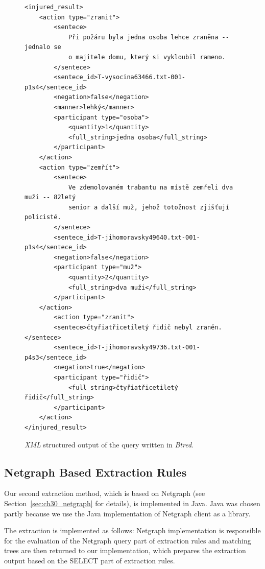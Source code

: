 \begin{figure}
\begin{verbatim}
<injured_result>
	<action type="zranit">
		<sentece>
			Při požáru byla jedna osoba lehce zraněna -- jednalo se
			o majitele domu, který si vykloubil rameno.
		</sentece>
		<sentece_id>T-vysocina63466.txt-001-p1s4</sentece_id>
		<negation>false</negation>
		<manner>lehký</manner>
		<participant type="osoba">
			<quantity>1</quantity>
			<full_string>jedna osoba</full_string>
		</participant>
	</action>
	<action type="zemřít">
		<sentece>
			Ve zdemolovaném trabantu na místě zemřeli dva muži -- 82letý
			senior a další muž, jehož totožnost zjišťují policisté.
		</sentece>
		<sentece_id>T-jihomoravsky49640.txt-001-p1s4</sentece_id>
		<negation>false</negation>
		<participant type="muž">
			<quantity>2</quantity>
			<full_string>dva muži</full_string>
		</participant>
	</action>
		<action type="zranit">
		<sentece>čtyřiatřicetiletý řidič nebyl zraněn.</sentece>
		<sentece_id>T-jihomoravsky49736.txt-001-p4s3</sentece_id>
		<negation>true</negation>
		<participant type="řidič">
			<full_string>čtyřiatřicetiletý řidič</full_string>
		</participant>
	</action>
</injured_result>
\end{verbatim}
\caption{\emph{XML} structured output of the query written in \emph{Btred}.}
\label{fig:btred_xml}
\end{figure}





\subsection{Netgraph Based Extraction Rules} \label{sec:ch50_Netgraph_Based_Extraction_Rules}

Our second extraction method, which is based on Netgraph (see Section~\ref{sec:ch30_netgraph} for details), is implemented in Java. Java was chosen partly because we use the Java implementation of Netgraph client as a library. 



The extraction is implemented as follows: Netgraph implementation is responsible for the evaluation of the Netgraph query part of extraction rules and matching trees are then returned to our implementation, which prepares the extraction output based on the SELECT part of extraction rules.




